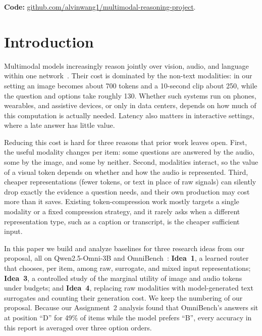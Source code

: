 \documentclass{article}
\begin{document}
\noindent\textbf{Code:} \href{https://github.com/alvinwang1/multimodal-reasoning-project/}{github.com/alvinwang1/multimodal-reasoning-project}.

\section{Introduction}
\label{sec:intro}

Multimodal models increasingly reason jointly over vision, audio, and language
within one network~\citep{lu2024unifiedio2,zhan2024anygpt,sun2024videosalmonn,xu2025qwen25omni}.
Their cost is dominated by the non-text modalities: in our setting an image becomes
about 700 tokens and a 10-second clip about 250, while the question and options
take roughly 130. Whether such systems run on phones, wearables, and assistive
devices, or only in data centers, depends on how much of this computation is
actually needed. Latency also matters in interactive settings, where a late answer
has little value.

Reducing this cost is hard for three reasons that prior work leaves open. First,
the useful modality changes per item: some questions are answered by the audio,
some by the image, and some by neither. Second, modalities interact, so the value
of a visual token depends on whether and how the audio is represented. Third,
cheaper representations (fewer tokens, or text in place of raw signals) can
silently drop exactly the evidence a question needs, and their own production may
cost more than it saves. Existing token-compression work mostly targets a single
modality or a fixed compression strategy, and it rarely asks when a different representation type, such as a caption or transcript, is the cheaper
sufficient input.

In this paper we build and analyze baselines for three research ideas from our
proposal, all on Qwen2.5-Omni-3B and OmniBench~\citep{li2025omnibench}:
\textbf{Idea~1}, a learned router that chooses, per item, among raw, surrogate, and
mixed input representations; \textbf{Idea~3}, a controlled study of the marginal
utility of image and audio tokens under budgets; and \textbf{Idea~4}, replacing raw
modalities with model-generated text surrogates and counting their
generation cost. We keep the numbering of our proposal. Because our Assignment~2 analysis found that
OmniBench's answers sit at position ``D'' for 49\% of items while the model prefers
``B'', every accuracy in this report is averaged over three option orders.
\end{document}
